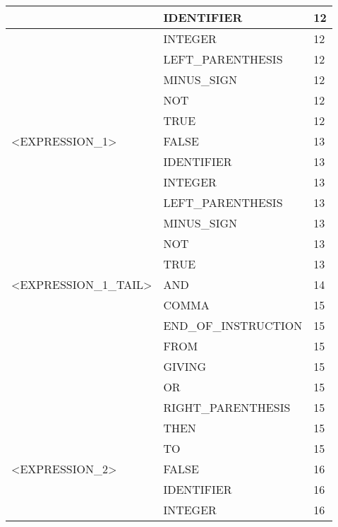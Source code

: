 \begin{longtable}{|l|l|l|}
                     &   IDENTIFIER           &   12 \\ \hline
                     &   INTEGER              &   12 \\ \hline
                     &   LEFT\_PARENTHESIS    &   12 \\ \hline
                     &   MINUS\_SIGN          &   12 \\ \hline
                     &   NOT                  &   12 \\ \hline
                     &   TRUE                 &   12 \\ \hline
<EXPRESSION\_1>                          &   FALSE                &   13 \\ \hline
                     &   IDENTIFIER           &   13 \\ \hline
                     &   INTEGER              &   13 \\ \hline
                     &   LEFT\_PARENTHESIS    &   13 \\ \hline
                     &   MINUS\_SIGN          &   13 \\ \hline
                     &   NOT                  &   13 \\ \hline
                     &   TRUE                 &   13 \\ \hline
<EXPRESSION\_1\_TAIL>                     &   AND                  &   14 \\ \hline
                     &   COMMA                &   15 \\ \hline
                     &   END\_OF\_INSTRUCTION &   15 \\ \hline
                     &   FROM                 &   15 \\ \hline
                     &   GIVING               &   15 \\ \hline
                     &   OR                   &   15 \\ \hline
                     &   RIGHT\_PARENTHESIS   &   15 \\ \hline
                     &   THEN                 &   15 \\ \hline
                     &   TO                   &   15 \\ \hline
<EXPRESSION\_2>                          &   FALSE                &   16 \\ \hline
                     &   IDENTIFIER           &   16 \\ \hline
                     &   INTEGER              &   16 \\ \hline

\end{longtable}
